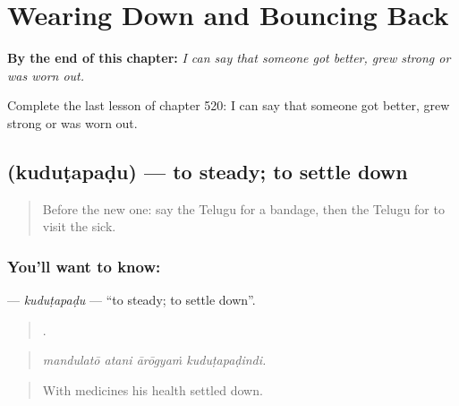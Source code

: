 
\chapter{Wearing Down and Bouncing Back}
\label{ch:te-wearing-down-and-bouncing-back}

\begin{chapteropening}
\textbf{By the end of this chapter:} \emph{I can say that someone got better, grew strong or was worn out.}

Complete the last lesson of chapter 520: I can say that someone got better, grew strong or was worn out.
\end{chapteropening}

\section[\texorpdfstring{\te{కుదుటపడు} (kuduṭapaḍu)}{కుదుటపడు (kuduṭapaḍu)}]{ (kuduṭapaḍu) — to steady; to settle down}

\label{lesson:TE-C520-kudutapadu}



\begin{quote}
Before the new one: say the Telugu for a bandage, then the Telugu for to visit the sick.
\end{quote}

\subsection*{You'll want to know: }
\textbf{} — \emph{kuduṭapaḍu} — \textquotedblleft{}to steady; to settle down\textquotedblright{}.

\begin{quote}
   .
\end{quote}

\begin{quote}
\emph{mandulatō atani ārōgyaṁ kuduṭapaḍindi.}
\end{quote}

\begin{quote}
With medicines his health settled down.
\end{quote}

